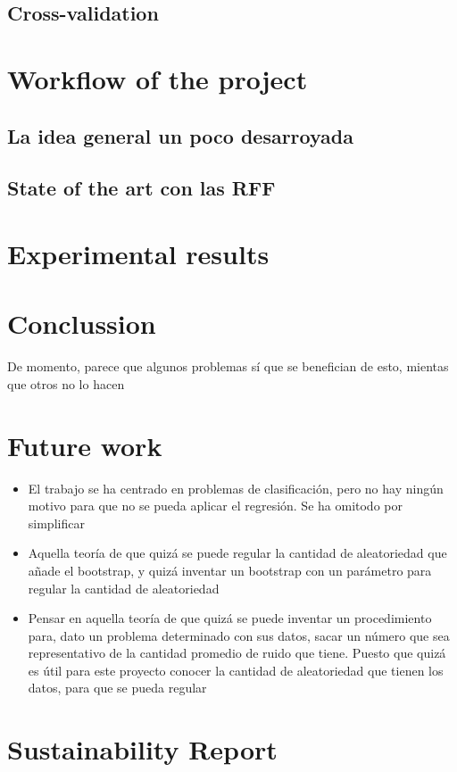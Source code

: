 \documentclass{article}
\begin{document}
    \subsection{Cross-validation}

\section{Workflow of the project}
  \subsection{La idea general un poco desarroyada}
  \subsection{State of the art con las RFF}



\section{Experimental results}
\section{Conclussion}
De momento, parece que algunos problemas sí que se benefician de esto, mientas
que otros no lo hacen
\section{Future work}
\begin{itemize}
\item El trabajo se ha centrado en problemas de clasificación, pero no hay
ningún motivo para que no se pueda aplicar el regresión. Se ha omitodo por
simplificar
\item Aquella teoría de que quizá se puede regular la cantidad de aleatoriedad
que añade el bootstrap, y quizá inventar un bootstrap con un parámetro para
regular la cantidad de aleatoriedad
\item Pensar en aquella teoría de que quizá se puede inventar un procedimiento
para, dato un problema determinado con sus datos, sacar un número que sea
representativo de la cantidad promedio de ruido que tiene. Puesto que quizá
es útil para este proyecto conocer la cantidad de aleatoriedad que tienen
los datos, para que se pueda regular
\end{itemize}
\section{Sustainability Report}
    
\end{document}
